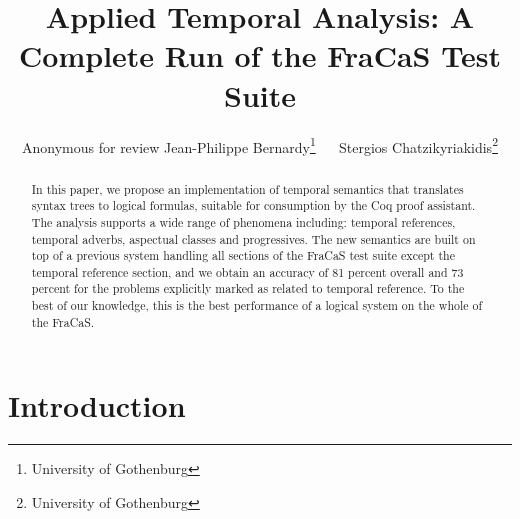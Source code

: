 \documentclass[11pt,a4paper]{article}
\begin{document}
\title{Applied Temporal Analysis: A Complete Run of the FraCaS Test Suite }

\author{\ifanon Anonymous for review\else
  {Jean-Philippe Bernardy}\footnote{University of Gothenburg} ~~ {Stergios Chatzikyriakidis}\footnote{University of Gothenburg}
}

\maketitle


\begin{abstract}In this paper, we propose an implementation of temporal semantics that
  translates syntax trees to logical formulas, suitable for
 consumption by the Coq proof assistant. The analysis  supports a wide range of phenomena
 including: temporal references, temporal adverbs, aspectual classes
 and progressives.  The new semantics are built on top of a previous system handling all sections of the FraCaS test suite except the temporal reference section, and we  obtain an accuracy of 81 percent overall and 73 percent for the problems explicitly marked
as related to temporal reference. To the best of our knowledge, this is the best performance of a logical system on the whole of the FraCaS. 
\end{abstract}


\section{Introduction}
\label{sec:introduction}
\end{document}
